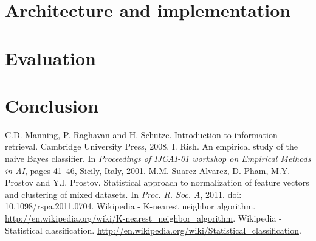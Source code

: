 \documentclass{llncs}
\begin{document}
\section{Architecture and implementation}


\section{Evaluation}

\section{Conclusion}

\begin{thebibliography}{99}
 C.D. Manning, P. Raghavan and H. Schutze. Introduction to information retrieval.  Cambridge University Press, 2008.  
 I. Rish. An empirical study of the naive Bayes classifier. In \emph{Proceedings of IJCAI-01 workshop on Empirical Methods in AI}, pages 41--46, Sicily, Italy, 2001.
 M.M. Suarez-Alvarez, D. Pham, M.Y. Prostov and Y.I. Prostov. Statistical approach to normalization of feature vectors and clustering of mixed datasets. In \emph{Proc. R. Soc. A}, 2011. doi: 10.1098/rspa.2011.0704. 
 Wikipedia - K-nearest neighbor algorithm. \url{http://en.wikipedia.org/wiki/K-nearest\_neighbor\_algorithm}.
 Wikipedia - Statistical classification. \url{http://en.wikipedia.org/wiki/Statistical\_classification}. 
\end{thebibliography}
\end{document}
